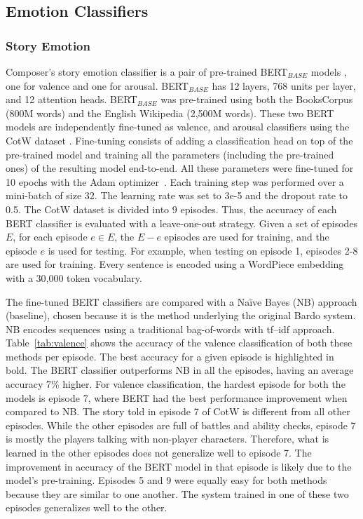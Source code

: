 \subsection{Emotion Classifiers}

\subsubsection{Story Emotion}

Composer's story emotion classifier is a pair of pre-trained BERT$_{BASE}$ models \cite{devlin2018bert}, one for valence and one for arousal. BERT$_{BASE}$ has 12 layers, 768 units per layer, and 12 attention heads. BERT$_{BASE}$ was pre-trained using both the BooksCorpus (800M words) \cite{zhu2015aligning} and the English Wikipedia (2,500M words). These two BERT models are independently fine-tuned as valence, and arousal classifiers using the CotW dataset \cite{padovani2017}. Fine-tuning consists of adding a classification head on top of the pre-trained model and training all the parameters (including the pre-trained ones) of the resulting model end-to-end. All these parameters were fine-tuned for 10 epochs with the Adam optimizer~\cite{adam14}. Each training step was performed over a mini-batch of size 32. The learning rate was set to 3e-5 and the dropout rate to 0.5. The CotW dataset is divided into 9 episodes. Thus, the accuracy of each BERT classifier is evaluated with a leave-one-out strategy. Given a set of episodes $E$, for each episode $e \in E$, the $E - e$ episodes are used for training, and the episode $e$ is used for testing. For example, when testing on episode 1, episodes 2-8 are used for training. Every sentence is encoded using a WordPiece embedding \cite{wu2016google} with a 30,000 token vocabulary.

The fine-tuned BERT classifiers are compared with a Na\"ive Bayes (NB) approach (baseline), chosen because it is the method underlying the original Bardo system. NB encodes sequences using a traditional bag-of-words with tf–idf approach. Table~\ref{tab:valence} shows the accuracy of the valence classification of both these methods per episode. The best accuracy for a given episode is highlighted in bold. The BERT classifier outperforms NB in all the episodes, having an average accuracy 7\% higher. For valence classification, the hardest episode for both the models is episode 7, where BERT had the best performance improvement when compared to NB. The story told in episode 7 of CotW is different from all other episodes. While the other episodes are full of battles and ability checks, episode 7 is mostly the players talking with non-player characters. Therefore, what is learned in the other episodes does not generalize well to episode 7. The improvement in accuracy of the BERT model in that episode is likely due to the model's pre-training. Episodes 5 and 9 were equally easy for both methods because they are similar to one another. The system trained in one of these two episodes generalizes well to the other.

